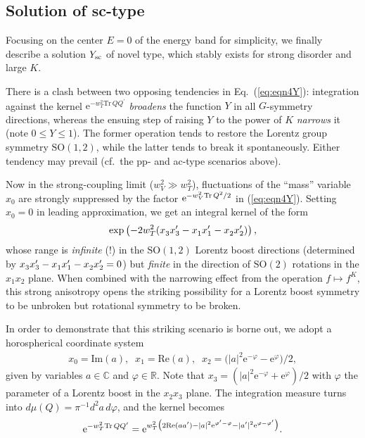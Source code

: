 \documentclass[aps,prl,twocolumn,letterpaper,superscriptaddress]{revtex4-2}
\begin{document}
\subsection{Solution of sc-type}
Focusing on the center $E = 0$ of the energy band for simplicity, we finally describe a solution $Y_{\rm sc}$ of novel type, which stably exists for strong disorder and large $K$.

There is a clash between two opposing tendencies in Eq.\ (\ref{eq:eqn4Y}): integration against the kernel $\mathrm{e}^{-w_T^2 \mathrm{Tr}\, Q Q^\prime}$ \emph{broadens} the function $Y$ in all $G$-symmetry directions, whereas the ensuing step of raising $Y$ to the power of $K$ \emph{narrows} it (note $0 \leq Y \leq 1$). The former operation tends to restore the Lorentz group symmetry $\mathrm{SO}(1,2)$, while the latter tends to break it spontaneously. Either tendency may prevail (cf.\ the pp- and ac-type scenarios above).

Now in the strong-coupling limit ($w_V^2 \gg w_T^2$), fluctuations of the ``mass'' variable $x_0$ are strongly suppressed by the factor $\mathrm{e}^{- w_V^2 {\rm Tr}\, Q^2 /2}$ in (\ref{eq:eqn4Y}). Setting $x_0 = 0$ in leading approximation, we get an integral kernel of the form
\begin{equation}
    \exp\left( - 2 w_T^2 (x_3^{\vphantom{\prime}} x_3^\prime - x_1^{\vphantom{\prime}} x_1^\prime - x_2^{\vphantom{\prime}} x_2^\prime) \right),
\end{equation}
whose range is \emph{infinite} (!) in the $\mathrm{SO}(1,2)$ Lorentz boost directions (determined by $x_3^{\vphantom{\prime}} x_3^\prime - x_1^{\vphantom{\prime}} x_1^\prime - x_2^{\vphantom{\prime}} x_2^\prime = 0$) but \emph{finite} in the direction of $\mathrm{SO}(2)$ rotations in the $x_1 x_2$ plane. When combined with the narrowing effect from the operation $f \mapsto f^{K}$, this strong anisotropy opens the striking possibility for a Lorentz boost symmetry to be unbroken but rotational symmetry to be broken.

In order to demonstrate that this striking scenario is borne out, we adopt a horospherical coordinate system
\begin{align}
    x_0 = \mathrm{Im}(a), \;\; x_1 = \mathrm{Re}(a) , \;\; x_2 = \big( |a|^2 \mathrm{e}^{- \varphi} - \mathrm{e}^\varphi \big) / 2 ,
\end{align}
given by variables $a \in \mathbb{C}$ and $\varphi \in \mathbb{R}$. Note that $x_3 = ( |a|^2 \mathrm{e}^{- \varphi} + \mathrm{e}^\varphi)/2$ with $\varphi$ the parameter of a Lorentz boost in the $x_2 x_3$ plane. The integration measure turns into $d\mu(Q) = \pi^{-1} d^2 a \, d\varphi$, and the kernel becomes
\begin{equation}
    \mathrm{e}^{- w_T^2 {\rm Tr}\, Q Q^\prime} = \mathrm{e}^{w_T^2 \big( 2 \mathrm{Re}(aa^\prime) - |a|^2 \mathrm{e}^{\varphi^\prime - \varphi}  - |a^\prime|^2 \mathrm{e}^{\varphi - \varphi^\prime} \big) } .
\end{equation}
\end{document}
